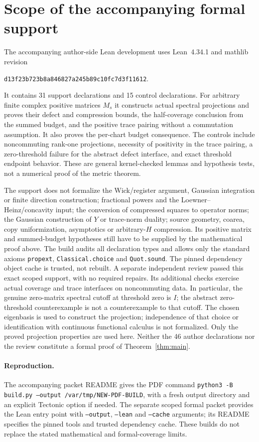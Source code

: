 \documentclass[11pt]{article}
\theoremstyle{remark}\newtheorem{remark}[theorem]{Remark}
\numberwithin{equation}{section}
\begin{document}
\section{Scope of the accompanying formal support}\label{sec:formal}
The accompanying author-side Lean development uses Lean~4.34.1 and
mathlib revision
\begin{center}\small\texttt{d13f23b723b8a846827a245b89c10fc7d3f11612}.\end{center}
It contains 31 support declarations and 15 control declarations. For
arbitrary finite complex positive matrices $M_s$ it constructs actual
spectral projections and proves their defect and compression bounds,
the half-coverage conclusion from the summed budget, and the positive
trace pairing without a commutation assumption. It also proves the
per-chart budget consequence. The controls include noncommuting
rank-one projections, necessity of positivity in the trace pairing,
a zero-threshold failure for the abstract defect interface, and exact
threshold endpoint behavior. These are general kernel-checked lemmas
and hypothesis tests, not a numerical proof of the metric theorem.

The support does not formalize the Wick/register argument, Gaussian
integration or finite direction construction; fractional powers and the
Loewner--Heinz/concavity input; the conversion of compressed squares to
operator norms; the Gaussian construction of $Y$ or trace-norm duality;
source geometry, coarea, copy uniformization, asymptotics or arbitrary-$H$
compression. Its positive matrix and summed-budget hypotheses still
have to be supplied by the mathematical proof above. The build audits
all declaration types and allows only the standard axioms
\texttt{propext}, \texttt{Classical.choice} and \texttt{Quot.sound}.
The pinned dependency object cache is trusted, not rebuilt. A separate
independent review passed this exact scoped support, with no required
repairs. Its additional checks exercise actual coverage and trace
interfaces on noncommuting data. In particular, the genuine zero-matrix
spectral cutoff at threshold zero is $I$; the abstract zero-threshold
counterexample is not a counterexample to that cutoff. The chosen
eigenbasis is used to construct the projection; independence of that
choice or identification with continuous functional calculus is not
formalized. Only the proved projection properties are used here. Neither
the 46 author declarations nor the review constitute a formal proof of
Theorem~\ref{thm:main}.

\paragraph{Reproduction.}
The accompanying packet README gives the PDF command
\texttt{python3 -B build.py --output /var/tmp/NEW-PDF-BUILD}, with a
fresh output directory and an explicit Tectonic option if needed.
The separate scoped formal packet 
provides the Lean entry point with \texttt{--output}, \texttt{--lean}
and \texttt{--cache} arguments; its README specifies the pinned tools
and trusted dependency cache. These builds do not replace the stated
mathematical and formal-coverage limits.
\end{document}
